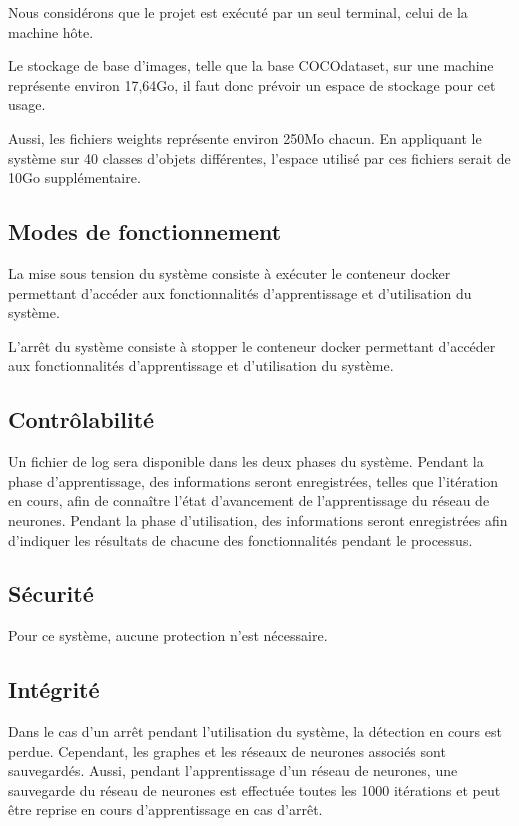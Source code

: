 \documentclass[debug,nodate,hideweeklyreports,noposter]{polytech/polytech}
\begin{document}
Nous considérons que le projet est exécuté par un seul terminal, celui de la machine hôte.

Le stockage de base d’images, telle que la base COCOdataset, sur une machine représente environ 17,64Go, il faut donc prévoir un espace de stockage pour cet usage.

Aussi, les fichiers weights représente environ 250Mo chacun. En appliquant le système sur 40 classes d'objets différentes, l'espace utilisé par ces fichiers serait de 10Go supplémentaire.

\subsection{Modes de fonctionnement}

La mise sous tension du système consiste à exécuter le conteneur docker permettant d'accéder aux fonctionnalités d’apprentissage et d’utilisation du système.

L’arrêt du système consiste à stopper le conteneur docker permettant d'accéder aux fonctionnalités d’apprentissage et d’utilisation du système.

\subsection{Contrôlabilité}

Un fichier de log sera disponible dans les deux phases du système.
Pendant la phase d’apprentissage, des informations seront enregistrées, telles que l’itération en cours, afin de connaître l’état d’avancement de l’apprentissage du réseau de neurones.
Pendant la phase d’utilisation, des informations seront enregistrées afin d’indiquer les résultats de chacune des fonctionnalités pendant le processus.

\subsection{Sécurité}

Pour ce système, aucune protection n’est nécessaire. 

\subsection{Intégrité}

Dans le cas d’un arrêt pendant l’utilisation du système, la détection en cours est perdue. Cependant, les graphes et les réseaux de neurones associés sont sauvegardés.
Aussi, pendant l’apprentissage d’un réseau de neurones, une sauvegarde du réseau de neurones est effectuée toutes les 1000 itérations et peut être reprise en cours d’apprentissage en cas d’arrêt.
\end{document}
